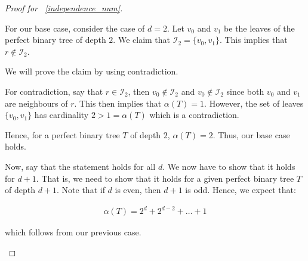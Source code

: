 \begin{proof}[Proof for ~\ref{independence_num}]
\begin{caseof}
		For our base case, consider the case of $d = 2$. Let $v_0$ and $v_1$ be the leaves of the perfect binary tree of depth $2$. We claim that $\mathcal{I}_2 = \{v_0, v_1\}$. This implies that $r \not\in \mathcal{I}_2$. 

		We will prove the claim by using contradiction.	

		For contradiction, say that $r \in \mathcal{I}_2$, then $v_0 \not\in \mathcal{I}_2$ and $v_0 \not\in \mathcal{I}_2$ since both $v_0$ and $v_1$ are neighbours of $r$. This then implies that $\alpha(T) = 1$. However, the set of leaves $\{v_0, v_1\}$ has cardinality $2 > 1 = \alpha(T)$ which is a contradiction.

		Hence, for a perfect binary tree $T$ of depth $2$, $\alpha(T) = 2$. Thus, our base case holds.


		Now, say that the statement holds for all $d$. We now have to show that it holds for $d+1$. That is, we need to show that it holds for a given perfect binary tree $T$ of depth $d + 1$. Note that if $d$ is even, then $d + 1$ is odd. Hence, we expect that:

		\begin{align*}
			\alpha(T) = 2^d + 2^{d - 2} + \ldots + 1
		\end{align*}

		which follows from our previous case.
	\end{caseof}
\end{proof}

